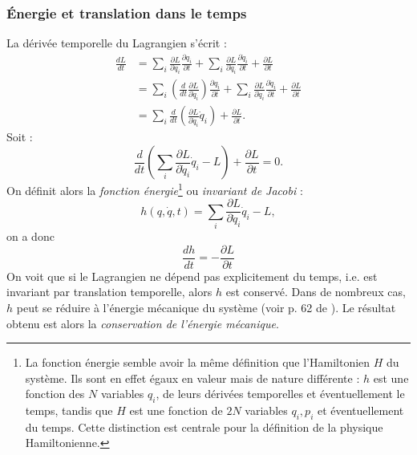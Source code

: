 \subsubsection{\'{E}nergie et translation dans le temps}
La dérivée temporelle du Lagrangien s'écrit : 
\begin{align}
\frac{dL}{dt}&=\sum_i\frac{\partial L}{\partial q_i}\frac{\partial q_i}{\partial t}+\sum_i\frac{\partial L}{\partial \dot{q}_i}\frac{\partial \dot{q}_i}{\partial t}+\frac{\partial L}{\partial t}\\
&= \sum_i\left(\frac{d}{dt}\frac{\partial L}{\partial \dot{q}_i}\right)\frac{\partial q_i}{\partial t}+\sum_i\frac{\partial L}{\partial \dot{q}_i}\frac{\partial \dot{q}_i}{\partial t}+\frac{\partial L}{\partial t}\\
&= \sum_i\frac{d}{dt}\left(\frac{\partial L}{\partial \dot{q}_i}\dot{q}_i\right)+\frac{\partial L}{\partial t}.
\end{align}
Soit :
\begin{equation}
\frac{d}{dt}\left(\sum_i\frac{\partial L}{\partial \dot{q}_i}\dot{q}_i-L\right)+\frac{\partial L}{\partial t}=0.
\end{equation}
On définit alors la \textit{fonction énergie}\footnote{La fonction énergie semble avoir la même définition que l'Hamiltonien $H$ du système. Ils sont en effet égaux en valeur mais de nature différente : $h$ est une fonction des $N$ variables ${q_i}$, de leurs dérivées temporelles et éventuellement le temps, tandis que $H$ est une fonction de $2N$ variables ${q_i,p_i}$ et éventuellement du temps. Cette distinction est centrale pour la définition de la physique Hamiltonienne.} ou \textit{invariant de Jacobi} :
\begin{equation}
h(q,\dot{q},t) = \sum_i\frac{\partial L}{\partial \dot{q}_i}\dot{q}_i-L,
\end{equation}
on a donc 
\begin{equation}
\frac{dh}{dt} = -\frac{\partial L}{\partial t}
\end{equation}
On voit que si le Lagrangien ne dépend pas explicitement du temps, i.e. est invariant par translation temporelle, alors $h$ est conservé. Dans de nombreux cas, $h$ peut se réduire à l'énergie mécanique du système (voir p. 62 de ). Le résultat obtenu est alors la \textit{conservation de l'énergie mécanique}. 


